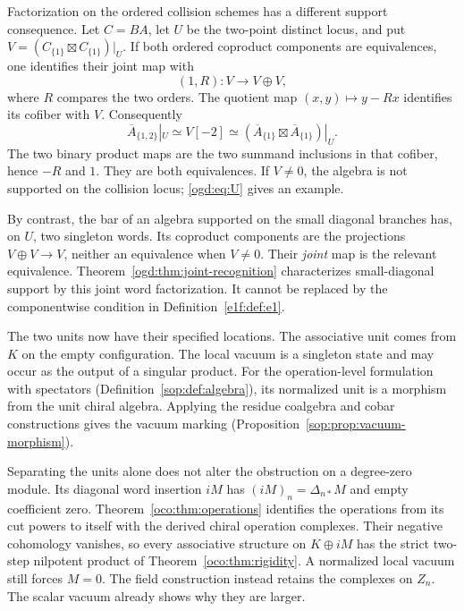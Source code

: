 \begin{remark}\label{e1f:rem:two-carriers}
Factorization on the ordered collision schemes has a
different support consequence. Let \(C=BA\), let \(U\)
be the two-point distinct locus, and put
\(V=(C_{\{1\}}\boxtimes C_{\{1\}})|_U\).
If both ordered coproduct components are equivalences,
one identifies their joint map with
\[
 (1,R):V\longrightarrow V\oplus V,
\]
where \(R\) compares the two orders. The quotient map
\((x,y)\mapsto y-Rx\) identifies its cofiber with \(V\).
Consequently
\[
 \overline A_{\{1,2\}}|_U
       \simeq V[-2]
       \simeq(\overline A_{\{1\}}
                         \boxtimes\overline A_{\{1\}})|_U.
\]
The two binary product maps are the two summand inclusions
in that cofiber, hence \(-R\) and \(1\). They are both
equivalences. If \(V\ne0\), the algebra is not supported
on the collision locus; \eqref{ogd:eq:U} gives an example.

By contrast, the bar of an algebra supported on the small
diagonal branches has, on \(U\), two singleton words.
Its coproduct components are the projections
\(V\oplus V\to V\), neither an equivalence when \(V\ne0\).
Their \emph{joint} map is the relevant equivalence.
Theorem~\ref{ogd:thm:joint-recognition} characterizes
small-diagonal support by this joint word factorization.
It cannot be replaced by the componentwise condition in
Definition~\ref{e1f:def:e1}.
\end{remark}

The two units now have their specified locations. The
associative unit comes from \(K\) on the empty configuration.
The local vacuum is a singleton state and may occur as the
output of a singular product. For the operation-level
formulation with spectators
(Definition~\ref{sop:def:algebra}), its normalized unit is
a morphism from the unit chiral algebra. Applying the residue
coalgebra and cobar constructions gives the vacuum marking
(Proposition~\ref{sop:prop:vacuum-morphism}).

Separating\label{e1f:def:degree-zero-diagonal-word} the units alone does not alter the obstruction
on a degree-zero module. Its diagonal word insertion \(iM\)
has \((iM)_n=\Delta_{n*}M\) and empty coefficient zero.
Theorem~\ref{oco:thm:operations} identifies the operations
from its cut powers to itself with the derived chiral
operation complexes. Their negative cohomology vanishes,
so every associative structure on \(K\oplus iM\) has the
strict two-step nilpotent product of
Theorem~\ref{oco:thm:rigidity}. A normalized local vacuum
still forces \(M=0\).
The field construction instead retains the complexes on
\(Z_n\). The scalar vacuum already shows why they are larger.

